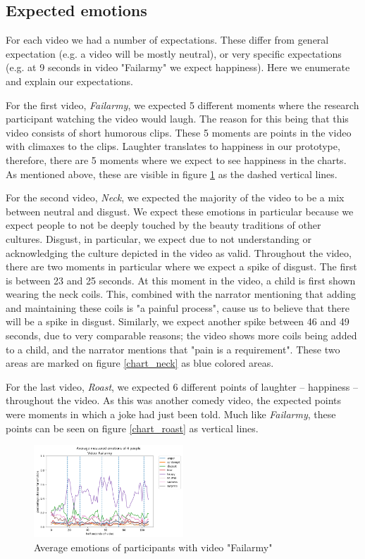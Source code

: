 \documentclass[sigconf]{acmart}
\begin{document}
\subsection{Expected emotions}
For each video we had a number of expectations. These differ from general expectation (e.g. a video will be
mostly neutral), or very specific expectations (e.g. at 9 seconds in video "Failarmy" we expect happiness).
Here we enumerate and explain our expectations.

For the first video, \emph{Failarmy}, we expected 5 different moments where the research participant watching
the video would laugh. The reason for this being that this video consists of short humorous clips. These 5
moments are points in the video with climaxes to the clips. Laughter translates to happiness in our prototype,
therefore, there are 5 moments where we expect to see happiness in the charts. As mentioned above,
these are visible in figure \ref{chart_failarmy} as the dashed vertical lines.

For the second video, \emph{Neck}, we expected the majority of the video to be a mix between neutral and disgust.
We expect these emotions in particular because we expect people to not be deeply touched by the beauty
traditions of other cultures. Disgust, in particular, we expect due to not understanding or acknowledging the
culture depicted in the video as valid. Throughout the video, there are two moments in particular where we
expect a spike of disgust. The first is between 23 and 25 seconds. At this moment in the video, a child is first
shown wearing the neck coils. This, combined with the narrator mentioning that adding and maintaining these coils
is "a painful process", cause us to believe that there will be a spike in disgust. Similarly, we expect another
spike between 46 and 49 seconds, due to very comparable reasons; the video shows more coils being added to a
child, and the narrator mentions that "pain is a requirement". These two areas are marked on figure
\ref{chart_neck} as blue colored areas.

For the last video, \emph{Roast}, we expected 6 different points of laughter -- happiness -- throughout
the video. As this was another comedy video, the expected points were moments in which a joke had just been told.
Much like \emph{Failarmy}, these points can be seen on figure \ref{chart_roast} as vertical lines.

\begin{figure}[H]
    \centering
    \includegraphics[width=0.5\textwidth, scale=1]{chart_failarmy_small.png}
    \caption{Average emotions of participants with video "Failarmy"}
    \label{chart_failarmy}
\end{figure}
\end{document}
